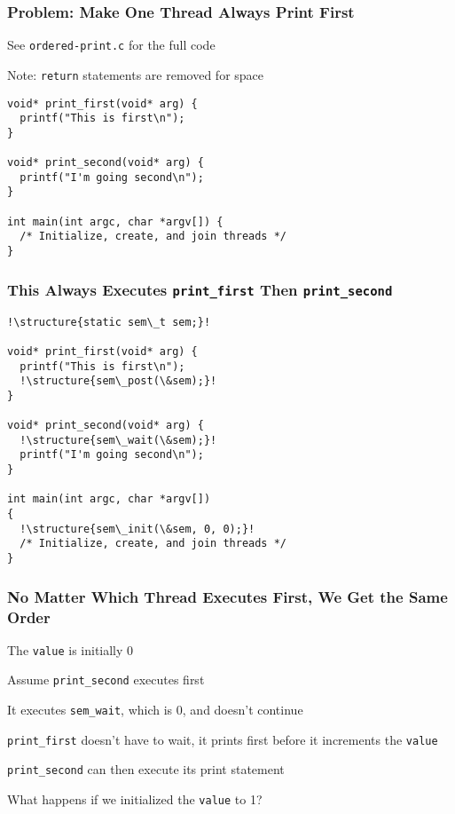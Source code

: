   \begin{frame}[fragile]
    \frametitle{Problem: Make One Thread Always Print First}

    See \texttt{ordered-print.c} for the full code

    \vspace{1em}

    \hspace{2em} Note: \texttt{return} statements are removed for space

    \vspace{1em}

    \begin{lstlisting}
void* print_first(void* arg) {
  printf("This is first\n");
}

void* print_second(void* arg) {
  printf("I'm going second\n");
}

int main(int argc, char *argv[]) {
  /* Initialize, create, and join threads */
}
    \end{lstlisting}
  \end{frame}

  \begin{frame}[fragile]
    \frametitle{This Always Executes \texttt{print\_first}
                Then \texttt{print\_second}}

    \begin{lstlisting}[escapechar=!]
!\structure{static sem\_t sem;}!

void* print_first(void* arg) {
  printf("This is first\n");
  !\structure{sem\_post(\&sem);}!
}

void* print_second(void* arg) {
  !\structure{sem\_wait(\&sem);}!
  printf("I'm going second\n");
}

int main(int argc, char *argv[])
{
  !\structure{sem\_init(\&sem, 0, 0);}!
  /* Initialize, create, and join threads */
}
    \end{lstlisting}
  \end{frame}

  \begin{frame}
    \frametitle{No Matter Which Thread Executes First, We Get the Same Order}

    The \texttt{value} is initially 0

    \vspace{2em}

    Assume \texttt{print\_second} executes first

    \hspace{2em} It executes \texttt{sem\_wait}, which is 0, and doesn't
    continue

    \vspace{2em}

    \texttt{print\_first} doesn't have to wait, it prints first before it
    increments the \texttt{value}

    \vspace{2em}

    \texttt{print\_second} can then execute its print statement

    \vspace{2em}

    What happens if we initialized the \texttt{value} to 1?
  \end{frame}

